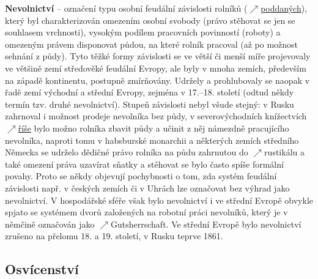 \documentclass{article}
\begin{document}
  {\bf Nevolnictví} -- označení typu osobní feudální závislosti rolníků ($\nearrow$\hyperref[sec:poddanstvi]{poddaných}), který byl charakterizován omezením osobní svobody (právo stěhovat se jen se souhlasem vrchnosti), vysokým podílem pracovních povinností (roboty) a omezeným právem disponovat půdou, na které rolník pracoval (až po možnost sehnání z půdy). Tyto těžké formy závislosti se ve větší či menší míře projevovaly ve většině zemí středověké feudální Evropy, ale byly v mnoha zemích, především na západě kontinentu, postupně zmírňovány. Udržely a prohlubovaly se naopak v řadě zemí východní a střední Evropy, zejména v 17.--18. století (odtud někdy termín tzv. druhé nevolnictví). Stupeň závislosti nebyl všude stejný: v Rusku zahrnoval i možnost prodeje nevolníka bez půdy, v severovýchodních knížectvích $\nearrow$\hyperref[sec:rise]{říše} bylo možno rolníka zbavit půdy a učinit z něj námezdně pracujícího nevolníka, naproti tomu v habsburské monarchii a některých zemích středního Německa se udrželo dědičné právo rolníka na půdu zahrnutou do $\nearrow$rustikálu a také omezení práva uzavírat sňatky a stěhovat se bylo často spíše formální povahy. Proto se někdy objevují pochybnosti o tom, zda systém feudální závislosti např. v českých zemích či v Uhrách lze označovat bez výhrad jako nevolnictví. V hospodářské sféře však bylo nevolnictví i ve střední Evropě obvykle spjato se systémem dvorů založených na robotní práci nevolníků, který je v němčině označován jako $\nearrow$Gutsherrschaft. Ve střední Evropě bylo nevolnictví zrušeno na přelomu 18. a 19. století, v Rusku teprve 1861.

  \subsection*{Osvícenství~\cite{Hroch:}}
  \label{sec:osvicenstvi}
\end{document}

